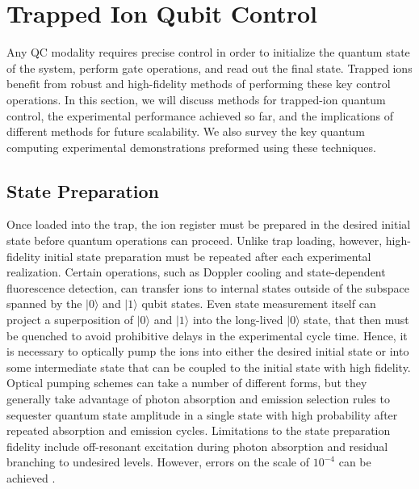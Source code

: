 \documentclass[%
reprint,
 amsmath,amssymb,
]{revtex4-1}
\newcommand{\zero}{|0 \rangle}
\newcommand{\one}{|1 \rangle}
\begin{document}
\section{Trapped Ion Qubit Control}
\label{sec_ion_control}

Any QC modality requires precise control in order to initialize the quantum state of the system, perform gate operations, and read out the final state. Trapped ions benefit from robust and high-fidelity methods of performing these key control operations. In this section, we will discuss methods for trapped-ion quantum control, the experimental performance achieved so far, and the implications of different methods for future scalability.  We also survey the key quantum computing experimental demonstrations preformed using these techniques.




\subsection{State Preparation}
Once loaded into the trap, the ion register must be prepared in the desired initial state before quantum operations can proceed. Unlike trap loading, however, high-fidelity initial state preparation must be repeated after each experimental realization. Certain operations, such as Doppler cooling and state-dependent fluorescence detection, can transfer ions to internal states outside of the subspace spanned by the $|0\rangle$ and  $|1\rangle$ qubit states. Even state measurement itself can project a superposition of $\zero$ and $\one$ into the long-lived $\zero$ state, that then must be quenched to avoid prohibitive delays in the experimental cycle time. Hence, it is necessary to optically pump the ions into either the desired initial state or into some intermediate state that can be coupled to the initial state with high fidelity. Optical pumping schemes can take a number of different forms, but they generally take advantage of photon absorption and emission selection rules to sequester quantum state amplitude in a single state with high probability after repeated absorption and emission cycles. Limitations to the state preparation fidelity include off-resonant excitation during photon absorption and residual branching to undesired levels. However, errors on the scale of $10^{-4}$ can be achieved \cite{HartyHighFidelityIons2014}.
\end{document}
